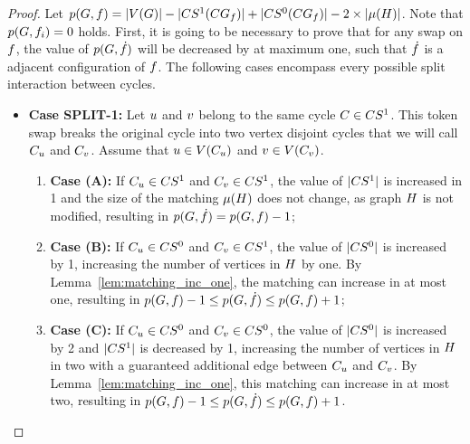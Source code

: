 \documentclass[msc]{ppgccufmg}    %
\begin{document}
\begin{proof}
Let $p(G, f) = |V(G)| - 
|CS^{1}(CG_{f})| +
|CS^{0}(CG_{f})| - 2\times|\mu(H)|$.
Note that $p(G, f_{i}) = 0$ holds.
First, it is going to be necessary to prove that for any swap on $f$,
the value of $p(G, \dot{f})$ will be decreased
by at maximum one, such that $\dot{f}$ is a adjacent configuration
of $f$.
The following cases encompass every possible split interaction between 
cycles.

\begin{itemize}
    \item \textbf{Case SPLIT-1:} Let $u$ and $v$ belong to 
    the same cycle $C \in CS^{1}$. 
    This token swap breaks the original cycle into two vertex disjoint cycles that
    we will call $C_{u}$ and $C_{v}$.
    Assume that $u \in V(C_{u})$ and 
    $v \in V(C_{v})$.
    
    \begin{enumerate}
        \item[] \textbf{Case (A):} If $C_{u} \in CS^{1}$ and 
        $C_{v} \in CS^{1}$, the value of $|CS^{1}|$ is
        increased in 1 and the size of the matching $\mu(H)$
        does not change, as graph $H$ is not modified, resulting in
        $p(G, \dot{f}) = p(G, f) - 1$;
        \item[] \textbf{Case (B):} If  $C_{u} \in CS^{0}$ and 
        $C_{v} \in CS^{1}$, the value of $|CS^{0}|$ is
        increased by 1, increasing the number of vertices in $H$ by
        one.
        By Lemma~\ref{lem:matching_inc_one}, the matching can increase in at most
        one, resulting in $p(G, f) - 1 \leq p(G, \dot{f}) \leq p(G, f) + 1$;
        \item[] \textbf{Case (C):} If $C_{u} \in CS^{0}$ and 
        $C_{v} \in CS^{0}$, the value of $|CS^{0}|$
        is increased by 2 and $|CS^{1}|$ is decreased by 1, increasing
        the number of vertices in $H$ in two with a guaranteed additional
        edge between $C_{u}$ and $C_{v}$.
        By Lemma~\ref{lem:matching_inc_one}, this matching can increase in at most
        two, resulting in $p(G, f) - 1 \leq p(G, \dot{f}) \leq p(G, f) + 1$.
    \end{enumerate}
    

\end{itemize}
\end{proof}
\end{document}
